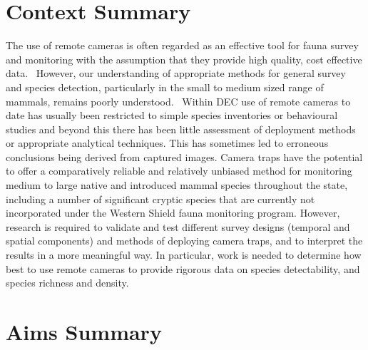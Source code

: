 \documentclass[version=last, paper=a4, DIV=18, usenames, dvipsnames]{scrartcl}
\begin{document}
\section{Context Summary}



The use of remote cameras is often regarded as an effective tool for fauna survey and monitoring with the assumption that they provide high quality, cost effective data.  However, our understanding of appropriate methods for general survey and species detection, particularly in the small to medium sized range of mammals, remains poorly understood.  Within DEC use of remote cameras to date has usually been restricted to simple species inventories or behavioural studies and beyond this there has been little assessment of deployment methods or appropriate analytical techniques. This has sometimes led to erroneous conclusions being derived from captured images. Camera traps have the potential to offer a comparatively reliable and relatively unbiased method for monitoring medium to large native and introduced mammal species throughout the state, including a number of significant cryptic species that are currently not incorporated under the Western Shield fauna monitoring program. However, research is required to validate and test different survey designs (temporal and spatial components) and methods of deploying camera traps, and to interpret the results in a more meaningful way. In particular, work is needed to determine how best to use remote cameras to provide rigorous data on species detectability, and species richness and density.






\section{Aims Summary}
\end{document}
